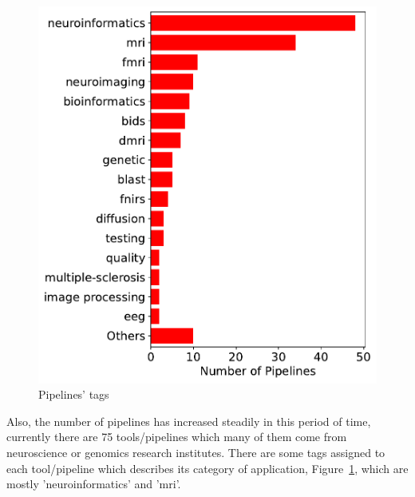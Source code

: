 \begin{figure}
    \centering
    \includegraphics[width=\textwidth,height=\textheight,keepaspectratio]{figures/Pipelines Tag.pdf}
    \caption{Pipelines' tags}
    \label{fig:pipelineTags}
\end{figure}



Also, the number of pipelines has increased steadily in this period of time, currently there are 75 tools/pipelines which many of them come from neuroscience or genomics research institutes. There are some tags assigned to each tool/pipeline which describes its category of application, Figure~\ref{fig:pipelineTags}, which are mostly 'neuroinformatics' and 'mri'.

